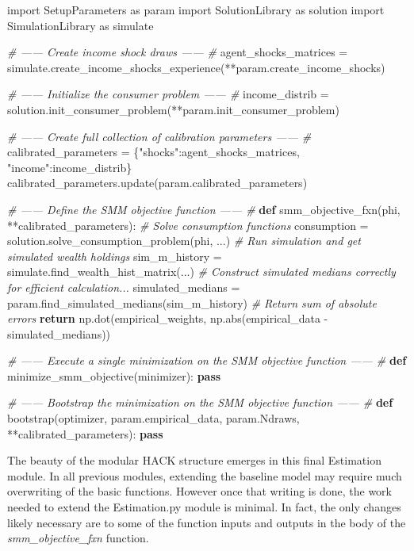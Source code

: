 \documentclass[]{article}
\newenvironment{Shaded}{}{}
\newcommand{\KeywordTok}[1]{\textcolor[rgb]{0.00,0.44,0.13}{\textbf{{#1}}}}
\newcommand{\DataTypeTok}[1]{\textcolor[rgb]{0.56,0.13,0.00}{{#1}}}
\newcommand{\CharTok}[1]{\textcolor[rgb]{0.25,0.44,0.63}{{#1}}}
\newcommand{\StringTok}[1]{\textcolor[rgb]{0.25,0.44,0.63}{{#1}}}
\newcommand{\CommentTok}[1]{\textcolor[rgb]{0.38,0.63,0.69}{\textit{{#1}}}}
\newcommand{\NormalTok}[1]{{#1}}
\begin{document}
\begin{Shaded}
\begin{Highlighting}[]
\CharTok{import} \NormalTok{SetupParameters }\CharTok{as} \NormalTok{param}
\CharTok{import} \NormalTok{SolutionLibrary }\CharTok{as} \NormalTok{solution}
\CharTok{import} \NormalTok{SimulationLibrary }\CharTok{as} \NormalTok{simulate}

\CommentTok{# ------ Create income shock draws ------ #}
\NormalTok{agent_shocks_matrices = simulate.create_income_shocks_experience(**param.create_income_shocks)}

\CommentTok{# ------ Initialize the consumer problem ------ #}
\NormalTok{income_distrib = solution.init_consumer_problem(**param.init_consumer_problem)}

\CommentTok{# ------ Create full collection of calibration parameters ------ #}
\NormalTok{calibrated_parameters = \{}\StringTok{"shocks"}\NormalTok{:agent_shocks_matrices, }\StringTok{"income"}\NormalTok{:income_distrib\}}
\NormalTok{calibrated_parameters.update(param.calibrated_parameters)}

\CommentTok{# ------ Define the SMM objective function ------ #}
\KeywordTok{def} \NormalTok{smm_objective_fxn(phi, **calibrated_parameters):}
    \CommentTok{#  Solve consumption functions}
    \NormalTok{consumption = solution.solve_consumption_problem(phi, ...)}
    \CommentTok{# Run simulation and get simulated wealth holdings}
    \NormalTok{sim_m_history = simulate.find_wealth_hist_matrix(...)}
    \CommentTok{# Construct simulated medians correctly for efficient calculation...}
    \NormalTok{simulated_medians = param.find_simulated_medians(sim_m_history)}
    \CommentTok{# Return sum of absolute errors}
    \KeywordTok{return} \NormalTok{np.dot(empirical_weights, np.}\DataTypeTok{abs}\NormalTok{(empirical_data - simulated_medians))}


\CommentTok{# ------ Execute a single minimization on the SMM objective function ------ #}
\KeywordTok{def} \NormalTok{minimize_smm_objective(minimizer):}
    \KeywordTok{pass}

\CommentTok{# ------ Bootstrap the minimization on the SMM objective function ------ #}
\KeywordTok{def} \NormalTok{bootstrap(optimizer, param.empirical_data, param.Ndraws, **calibrated_parameters):}
    \KeywordTok{pass}
\end{Highlighting}
\end{Shaded}

The beauty of the modular HACK structure emerges in this final
Estimation module. In all previous modules, extending the baseline model
may require much overwriting of the basic functions. However once that
writing is done, the work needed to extend the Estimation.py module is
minimal. In fact, the only changes likely necessary are to some of the
function inputs and outputs in the body of the
\emph{smm\_objective\_fxn} function.
\end{document}
